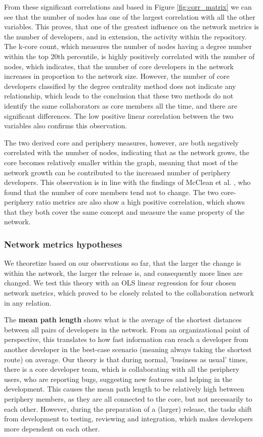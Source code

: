 From these significant correlations and based in Figure \ref{fig:corr_matrix} we can see that the number of nodes has one of the largest correlation with all the other variables. This proves, that one of the greatest influence on the network metrics is the number of developers, and in extension, the activity within the repository. The k-core count, which measures the number of nodes having a degree number within the top 20th percentile, is highly positively correlated with the number of nodes, which indicates, that the number of core developers in the network increases in proportion to the network size. However, the number of core developers classified by the degree centrality method does not indicate any relationship, which leads to the conclusion that these two methods do not identify the same collaborators as core members all the time, and there are significant differences. The low positive linear correlation between the two variables also confirms this observation.

The two derived core and periphery measures, however, are both negatively correlated with the number of nodes, indicating that as the network grows, the core becomes relatively smaller within the graph, meaning that most of the network growth can be contributed to the increased number of periphery developers. This observation is in line with the findings of McClean et al. \cite{mccleanSocialNetworkAnalysis2021}, who found that the number of core members tend not to change. The two core-periphery ratio metrics are also show a high positive correlation, which shows that they both cover the same concept and measure the same property of the network.

\subsubsection{Network metrics hypotheses}

We theoretize based on our observations so far, that the larger the change is within the network, the larger the release is, and consequently more lines are changed. We test this theory with an OLS linear regression for four chosen network metrics, which proved to be closely related to the collaboration network in any relation.

The \textbf{mean path length} shows what is the average of the shortest distances between all pairs of developers in the network. From an organizational point of perspective, this translates to how fast information can reach a developer from another developer in the best-case scenario (meaning always taking the shortest route) on average. Our theory is that during normal, 'business as usual' times, there is a core developer team, which is collaborating with all the periphery users, who are reporting bugs, suggesting new features and helping in the development. This causes the mean path length to be relatively high between periphery members, as they are all connected to the core, but not necessarily to each other. However, during the preparation of a (larger) release, the tasks shift from development to testing, reviewing and integration, which makes developers more dependent on each other. 

